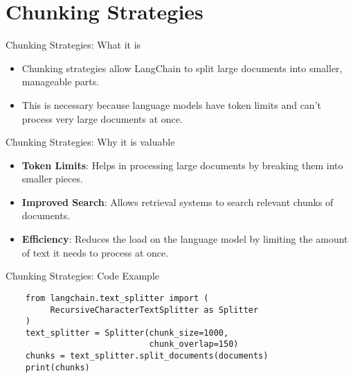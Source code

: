 \documentclass{beamer}
\begin{document}
\section{Chunking Strategies}

\begin{frame}{Chunking Strategies: What it is}
    \begin{itemize}
        \item Chunking strategies allow LangChain to split large documents into smaller, manageable parts.
        \item This is necessary because language models have token limits and can't process very large documents at once.
    \end{itemize}
\end{frame}

\begin{frame}{Chunking Strategies: Why it is valuable}
    \begin{itemize}
        \item \textbf{Token Limits}: Helps in processing large documents by breaking them into smaller pieces.
        \item \textbf{Improved Search}: Allows retrieval systems to search relevant chunks of documents.
        \item \textbf{Efficiency}: Reduces the load on the language model by limiting the amount of text it needs to process at once.
    \end{itemize}
\end{frame}

\begin{frame}[fragile]{Chunking Strategies: Code Example}
    \begin{verbatim}
    from langchain.text_splitter import (
         RecursiveCharacterTextSplitter as Splitter
    )
    text_splitter = Splitter(chunk_size=1000,
                             chunk_overlap=150)
    chunks = text_splitter.split_documents(documents)
    print(chunks)
    \end{verbatim}
\end{frame}

\end{document}
